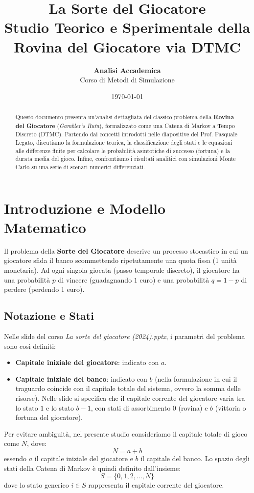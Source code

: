 \documentclass[11pt,a4paper]{article}
\title{\textbf{La Sorte del Giocatore} \\ \large Studio Teorico e Sperimentale della Rovina del Giocatore via DTMC}
\author{\textbf{Analisi Accademica} \\ Corso di Metodi di Simulazione}
\date{\today}
\begin{document}
\maketitle

\begin{abstract}
Questo documento presenta un'analisi dettagliata del classico problema della \textbf{Rovina del Giocatore} (\textit{Gambler's Ruin}), formalizzato come una Catena di Markov a Tempo Discreto (DTMC). Partendo dai concetti introdotti nelle diapositive del Prof. Pasquale Legato, discutiamo la formulazione teorica, la classificazione degli stati e le equazioni alle differenze finite per calcolare le probabilità asintotiche di successo (fortuna) e la durata media del gioco. Infine, confrontiamo i risultati analitici con simulazioni Monte Carlo su una serie di scenari numerici differenziati.
\end{abstract}

\section{Introduzione e Modello Matematico}
Il problema della \textbf{Sorte del Giocatore} descrive un processo stocastico in cui un giocatore sfida il banco scommettendo ripetutamente una quota fissa ($1$ unità monetaria). Ad ogni singola giocata (passo temporale discreto), il giocatore ha una probabilità $p$ di vincere (guadagnando $1$ euro) e una probabilità $q = 1 - p$ di perdere (perdendo $1$ euro). 

\subsection{Notazione e Stati}
Nelle slide del corso \textit{La sorte del giocatore (2024).pptx}, i parametri del problema sono così definiti:
\begin{itemize}
    \item \textbf{Capitale iniziale del giocatore}: indicato con $a$.
    \item \textbf{Capitale iniziale del banco}: indicato con $b$ (nella formulazione in cui il traguardo coincide con il capitale totale del sistema, ovvero la somma delle risorse). Nelle slide si specifica che il capitale corrente del giocatore varia tra lo stato $1$ e lo stato $b-1$, con stati di assorbimento $0$ (rovina) e $b$ (vittoria o fortuna del giocatore).
\end{itemize}

Per evitare ambiguità, nel presente studio consideriamo il capitale totale di gioco come $N$, dove:
\begin{equation}
N = a + b
\end{equation}
essendo $a$ il capitale iniziale del giocatore e $b$ il capitale del banco. Lo spazio degli stati della Catena di Markov è quindi definito dall'insieme:
\begin{equation}
S = \{0, 1, 2, \dots, N\}
\end{equation}
dove lo stato generico $i \in S$ rappresenta il capitale corrente del giocatore.
\end{document}

